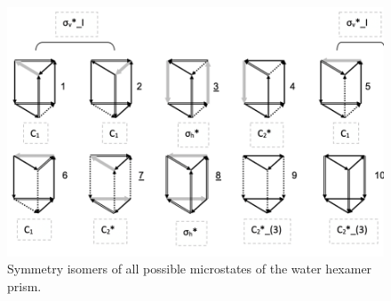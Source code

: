 \begin{figure}[t]
\uwsinglespace
\begin{center}
\includegraphics[width=\textwidth]{Figures/Chapter_6/symmetry_configurations.png}
\end{center}
\begin{spacing}{1.0}
\caption[Symmetry isomers of all possible microstates of the water hexamer prism.]{Symmetry isomers of all possible microstates of the water hexamer prism.}\label{fig:MBE_III_F1}
\end{spacing}
\end{figure}